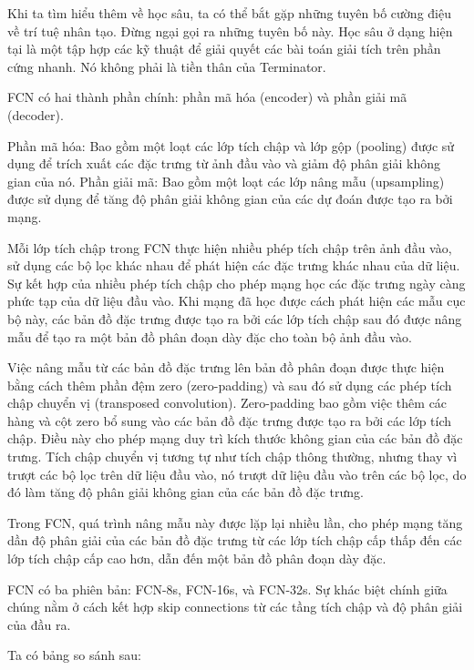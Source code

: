 \documentclass[../main.tex]{subfiles}
\begin{document}
Khi ta tìm hiểu thêm về học sâu, ta có thể bắt gặp những tuyên bố cường điệu về trí tuệ nhân tạo. Đừng ngại gọi ra những tuyên bố này. Học sâu ở dạng hiện tại là một tập hợp các kỹ thuật để giải quyết các bài toán giải tích trên phần cứng nhanh. Nó không phải là tiền thân của Terminator.

FCN có hai thành phần chính: phần mã hóa (encoder) và phần giải mã (decoder).

Phần mã hóa: Bao gồm một loạt các lớp tích chập và lớp gộp (pooling) được sử dụng để trích xuất các đặc trưng từ ảnh đầu vào và giảm độ phân giải không gian của nó.
Phần giải mã: Bao gồm một loạt các lớp nâng mẫu (upsampling) được sử dụng để tăng độ phân giải không gian của các dự đoán được tạo ra bởi mạng.

Mỗi lớp tích chập trong FCN thực hiện nhiều phép tích chập trên ảnh đầu vào, sử dụng các bộ lọc khác nhau để phát hiện các đặc trưng khác nhau của dữ liệu. Sự kết hợp của nhiều phép tích chập cho phép mạng học các đặc trưng ngày càng phức tạp của dữ liệu đầu vào. Khi mạng đã học được cách phát hiện các mẫu cục bộ này, các bản đồ đặc trưng được tạo ra bởi các lớp tích chập sau đó được nâng mẫu để tạo ra một bản đồ phân đoạn dày đặc cho toàn bộ ảnh đầu vào.


Việc nâng mẫu từ các bản đồ đặc trưng lên bản đồ phân đoạn được thực hiện bằng cách thêm phần đệm zero (zero-padding) và sau đó sử dụng các phép tích chập chuyển vị (transposed convolution). Zero-padding bao gồm việc thêm các hàng và cột zero bổ sung vào các bản đồ đặc trưng được tạo ra bởi các lớp tích chập. Điều này cho phép mạng duy trì kích thước không gian của các bản đồ đặc trưng. Tích chập chuyển vị tương tự như tích chập thông thường, nhưng thay vì trượt các bộ lọc trên dữ liệu đầu vào, nó trượt dữ liệu đầu vào trên các bộ lọc, do đó làm tăng độ phân giải không gian của các bản đồ đặc trưng.

Trong FCN, quá trình nâng mẫu này được lặp lại nhiều lần, cho phép mạng tăng dần độ phân giải của các bản đồ đặc trưng từ các lớp tích chập cấp thấp đến các lớp tích chập cấp cao hơn, dẫn đến một bản đồ phân đoạn dày đặc.

FCN có ba phiên bản: FCN-8s, FCN-16s, và FCN-32s. Sự khác biệt chính giữa chúng nằm ở cách kết hợp skip connections từ các tầng tích chập và độ phân giải của đầu ra.

Ta có bảng so sánh sau:
\end{document}
